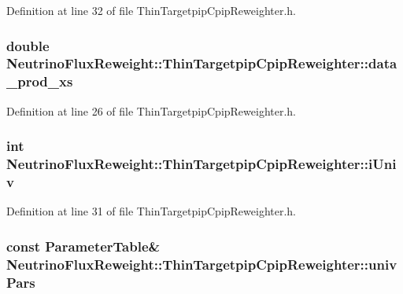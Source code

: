 Definition at line 32 of file Thin\-Targetpip\-Cpip\-Reweighter.\-h.

\hypertarget{class_neutrino_flux_reweight_1_1_thin_targetpip_cpip_reweighter_a7c7cf904549d046af9ce12b44f39d92f}{
\subsubsection[{data\-\_\-prod\-\_\-xs}]{\setlength{\rightskip}{0pt plus 5cm}double Neutrino\-Flux\-Reweight\-::\-Thin\-Targetpip\-Cpip\-Reweighter\-::data\-\_\-prod\-\_\-xs}}\label{class_neutrino_flux_reweight_1_1_thin_targetpip_cpip_reweighter_a7c7cf904549d046af9ce12b44f39d92f}


Definition at line 26 of file Thin\-Targetpip\-Cpip\-Reweighter.\-h.

\hypertarget{class_neutrino_flux_reweight_1_1_thin_targetpip_cpip_reweighter_a41ab96e7fbc624fe119247d66cf6ad70}{
\subsubsection[{i\-Univ}]{\setlength{\rightskip}{0pt plus 5cm}int Neutrino\-Flux\-Reweight\-::\-Thin\-Targetpip\-Cpip\-Reweighter\-::i\-Univ\hspace{0.3cm}{\ttfamily [private]}}}\label{class_neutrino_flux_reweight_1_1_thin_targetpip_cpip_reweighter_a41ab96e7fbc624fe119247d66cf6ad70}


Definition at line 31 of file Thin\-Targetpip\-Cpip\-Reweighter.\-h.

\hypertarget{class_neutrino_flux_reweight_1_1_thin_targetpip_cpip_reweighter_a9523dc5549efc3823b4cdae9236bd9f6}{
\subsubsection[{univ\-Pars}]{\setlength{\rightskip}{0pt plus 5cm}const {\bf Parameter\-Table}\& Neutrino\-Flux\-Reweight\-::\-Thin\-Targetpip\-Cpip\-Reweighter\-::univ\-Pars\hspace{0.3cm}{\ttfamily [private]}}}\label{class_neutrino_flux_reweight_1_1_thin_targetpip_cpip_reweighter_a9523dc5549efc3823b4cdae9236bd9f6}


